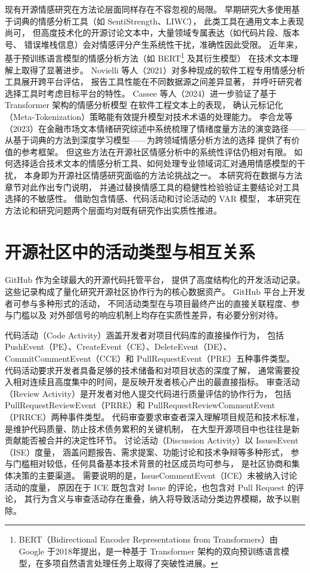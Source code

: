 \documentclass[
    type = master, %
    degree = professional,        %
    decl-page,  %
    twoside,                %
    fontset = fandol %
  ]{njuthesis}
\begin{document}
现有开源情感研究在方法论层面同样存在不容忽视的局限。
早期研究大多使用基于词典的情感分析工具（如 SentiStrength、LIWC），
此类工具在通用文本上表现尚可，
但高度技术化的开源讨论文本中，大量领域专属表达（如代码片段、版本号、
错误堆栈信息）会对情感评分产生系统性干扰，准确性因此受限。
近年来，基于预训练语言模型的情感分析方法（如 BERT\footnote{BERT（Bidirectional Encoder Representations from Transformers）由 Google 于2018年提出，是一种基于 Transformer 架构的双向预训练语言模型，在多项自然语言处理任务上取得了突破性进展。} 及其衍生模型）
在技术文本理解上取得了显著进步。
Novielli 等人（2021）对多种现成的软件工程专用情感分析工具展开跨平台评估，
报告工具性能在不同数据源之间差异显著，
并呼吁研究者选择工具时考虑目标平台的特性\cite{novielli2021assessment}。
Cassee 等人（2024）进一步验证了基于 Transformer 架构的情感分析模型
在软件工程文本上的表现，
确认元标记化（Meta-Tokenization）策略能有效提升模型对技术术语的处理能力\cite{cassee2024transformers}。
李合龙等（2023）在金融市场文本情绪研究综述中系统梳理了情绪度量方法的演变路径——
从基于词典的方法到深度学习模型——为跨领域情感分析方法的选择
提供了有价值的参考框架\cite{li2023sentiment}。
但这些方法在开源社区情感分析中的系统性评估仍相对有限。
如何选择适合技术文本的情感分析工具、如何处理专业领域词汇对通用情感模型的干扰，
本身即为开源社区情感研究面临的方法论挑战之一。
本研究将在数据与方法章节对此作出专门说明，
并通过替换情感工具的稳健性检验验证主要结论对工具选择的不敏感性。
借助包含情感、代码活动和讨论活动的 VAR 模型，
本研究在方法论和研究问题两个层面均对既有研究作出实质性推进。

\section{开源社区中的活动类型与相互关系}

GitHub 作为全球最大的开源代码托管平台，
提供了高度结构化的开发活动记录。
这些记录构成了量化研究开源社区协作行为的核心数据资产\cite{alami2024sustainability}。
GitHub 平台上开发者可参与多种形式的活动，
不同活动类型在与项目最终产出的直接关联程度、参与门槛以及
对外部信号的响应机制上均存在实质性差异，有必要分别对待。

代码活动（Code Activity）涵盖开发者对项目代码库的直接操作行为，
包括 PushEvent（PE）、CreateEvent（CE）、DeleteEvent（DE）、CommitCommentEvent（CCE）和 PullRequestEvent（PRE）五种事件类型。
代码活动要求开发者具备足够的技术储备和对项目状态的深度了解，
通常需要投入相对连续且高度集中的时间，是反映开发者核心产出的最直接指标。
审查活动（Review Activity）是开发者对他人提交代码进行质量评估的协作行为，
包括 PullRequestReviewEvent（PRRE）和 PullRequestReviewCommentEvent（PRRCE）两种事件类型。
代码审查要求审查者深入理解项目规范和技术标准，
是维护代码质量、防止技术债务累积的关键机制，
在大型开源项目中也往往是新贡献能否被合并的决定性环节。
讨论活动（Discussion Activity）以 IssuesEvent（ISE）度量，
涵盖问题报告、需求提案、功能讨论和技术争辩等多种形式，
参与门槛相对较低，任何具备基本技术背景的社区成员均可参与，
是社区协商和集体决策的主要渠道。
需要说明的是，IssueCommentEvent（ICE）未被纳入讨论活动的度量，
原因在于 ICE 既包含对 Issue 的评论，也包含对 Pull Request 的评论，
其行为含义与审查活动存在重叠，纳入将导致活动分类边界模糊，故予以剔除。
\end{document}
